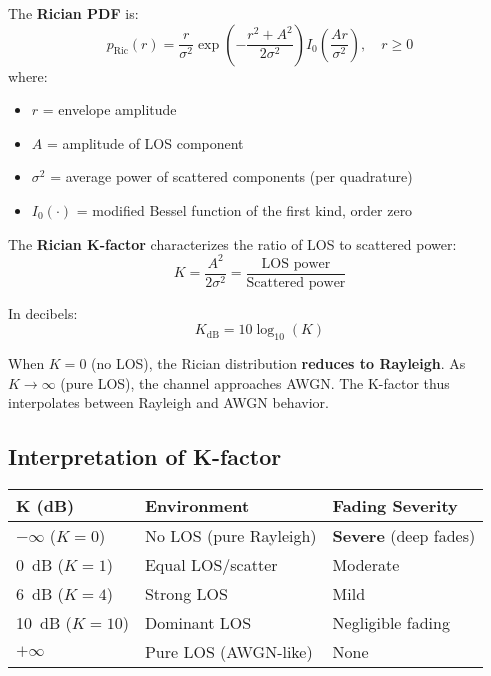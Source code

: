 The \textbf{Rician PDF} is:
\begin{equation}
p_{\text{Ric}}(r) = \frac{r}{\sigma^2} \exp\left(-\frac{r^2 + A^2}{2\sigma^2}\right) I_0\left(\frac{Ar}{\sigma^2}\right), \quad r \geq 0
\end{equation}
where:
\begin{itemize}
\item $r$ = envelope amplitude
\item $A$ = amplitude of LOS component
\item $\sigma^2$ = average power of scattered components (per quadrature)
\item $I_0(\cdot)$ = modified Bessel function of the first kind, order zero
\end{itemize}

The \textbf{Rician K-factor} characterizes the ratio of LOS to scattered power:
\begin{equation}
K = \frac{A^2}{2\sigma^2} = \frac{\text{LOS power}}{\text{Scattered power}}
\end{equation}

In decibels:
\begin{equation}
K_{\text{dB}} = 10\log_{10}(K)
\end{equation}

\begin{keyconcept}
When $K = 0$ (no LOS), the Rician distribution \textbf{reduces to Rayleigh}. As $K \to \infty$ (pure LOS), the channel approaches AWGN. The K-factor thus interpolates between Rayleigh and AWGN behavior.
\end{keyconcept}

\subsection{Interpretation of K-factor}

\begin{center}
\begin{tabular}{lll}
\toprule
\textbf{K (dB)} & \textbf{Environment} & \textbf{Fading Severity} \\
\midrule
$-\infty$ ($K=0$) & No LOS (pure Rayleigh) & \textbf{Severe} (deep fades) \\
0~dB ($K=1$) & Equal LOS/scatter & Moderate \\
6~dB ($K=4$) & Strong LOS & Mild \\
10~dB ($K=10$) & Dominant LOS & Negligible fading \\
$+\infty$ & Pure LOS (AWGN-like) & None \\
\bottomrule
\end{tabular}
\end{center}

